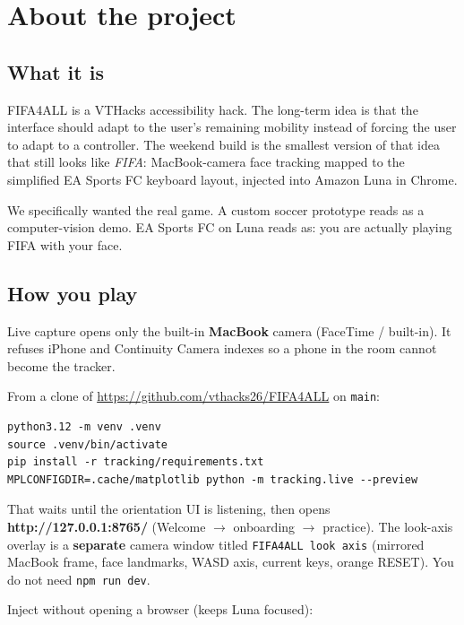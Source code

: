 \documentclass[11pt]{article}
\begin{document}
\section{About the project}

\subsection*{What it is}

FIFA4ALL is a VTHacks accessibility hack. The long-term idea is that the
interface should adapt to the user's remaining mobility instead of forcing
the user to adapt to a controller. The weekend build is the smallest version
of that idea that still looks like \emph{FIFA}: MacBook-camera face tracking
mapped to the simplified EA Sports FC keyboard layout, injected into Amazon
Luna in Chrome.

We specifically wanted the real game. A custom soccer prototype reads as a
computer-vision demo. EA Sports FC on Luna reads as: you are actually
playing FIFA with your face.

\subsection*{How you play}

Live capture opens only the built-in \textbf{MacBook} camera (FaceTime /
built-in). It refuses iPhone and Continuity Camera indexes so a phone in the
room cannot become the tracker.

From a clone of \url{https://github.com/vthacks26/FIFA4ALL} on \texttt{main}:

\begin{verbatim}
python3.12 -m venv .venv
source .venv/bin/activate
pip install -r tracking/requirements.txt
MPLCONFIGDIR=.cache/matplotlib python -m tracking.live --preview
\end{verbatim}

That waits until the orientation UI is listening, then opens
\textbf{http://127.0.0.1:8765/} (Welcome $\rightarrow$ onboarding $\rightarrow$
practice). The look-axis overlay is a \textbf{separate} camera window titled
\texttt{FIFA4ALL look axis} (mirrored MacBook frame, face landmarks, WASD
axis, current keys, orange RESET). You do not need \texttt{npm run dev}.

Inject without opening a browser (keeps Luna focused):
\end{document}
